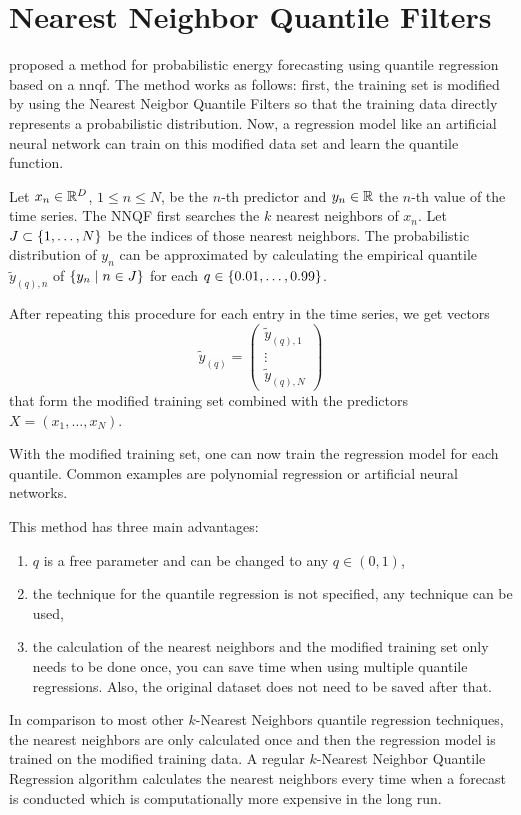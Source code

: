 \section{Nearest Neighbor Quantile Filters}
\label{sec:nnqf}

\Textcite{Ordiano2019} proposed a method for probabilistic 
energy forecasting using quantile regression based on a \gls{nnqf}. 
The method works as follows: first, the training set is modified 
by using the Nearest Neigbor Quantile Filters so that 
the training data directly represents a probabilistic distribution. 
Now, a regression model like an artificial neural network can 
train on this modified data set and learn the quantile function.

Let \(x_n \in \mathbb{R}^D\), \(1 \leq n \leq N\), be the \(n\)-th predictor 
and \(y_n \in \mathbb{R}\) the \(n\)-th value of the time series. 
The NNQF first searches the \(k\) nearest neighbors of \(x_n\). 
Let \(J \subset \{1, \ldots, N\}\) be the indices of 
those nearest neighbors. 
The probabilistic distribution of \(y_n\) can be approximated 
by calculating the empirical quantile \(\tilde{y}_{(q),n}\) of 
\(\{y_n \;|\; n\in J\}\) for each \(q \in \{0.01, \ldots, 0.99\}\). 

After repeating this procedure for each entry in the time series, 
we get vectors 
\[ \tilde{y}_{(q)} = \begin{pmatrix}
    \tilde{y}_{(q), 1} \\ 
    \vdots \\
    \tilde{y}_{(q), N}
\end{pmatrix} \]
that form the modified training set combined with the 
predictors \(X = (x_1, \ldots, x_N)\).

With the modified training set, one can now train the regression model 
for each quantile. Common examples are polynomial regression or 
artificial neural networks. 

This method has three main advantages: 
\begin{enumerate}
    \item \(q\) is a free parameter and can be changed to any \(q \in (0,1)\),
    \item the technique for the quantile regression is not specified, 
    any technique can be used,
    \item the calculation of the nearest neighbors and the modified 
    training set only needs to be done once, you can save time when 
    using multiple quantile regressions. Also, the original dataset 
    does not need to be saved after that.
\end{enumerate}

In comparison to most other \(k\)-Nearest Neighbors quantile 
regression techniques, the nearest neighbors are only calculated once 
and then the regression model is trained on the modified training data. 
A regular \(k\)-Nearest Neighbor Quantile Regression algorithm 
calculates the nearest neighbors every time when a forecast is conducted 
which is computationally more expensive in the long run.